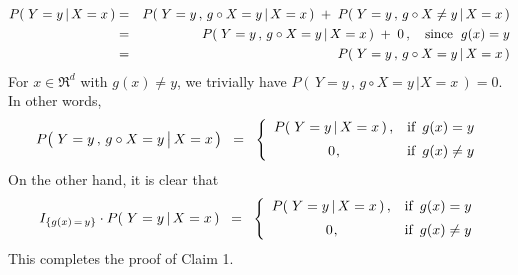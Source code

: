 \begin{eqnarray*}
P\!\left(\,\left. Y = y \,\right\vert X = x \,\right)
& = &
	P\!\left(\,\left. Y = y\,,\, g \circ X = y \,\right\vert X = x \,\right)
	\; + \;
	P\!\left(\,\left. Y = y\,,\, g \circ X \neq y \,\right\vert X = x \,\right)
\\
& = &
	P\!\left(\,\left. Y = y\,,\, g \circ X = y \,\right\vert X = x \,\right)
	\; + \;
	0\,,
	\quad
	\textnormal{since \;$g(x) = y$}
\\
& = &
	P\!\left(\,\left. Y = y\,,\, g \circ X = y \,\right\vert X = x \,\right)
\end{eqnarray*}
For $x \in \Re^{d}$ with $g(x) \neq y$, we trivially have
$P\!\left(\,\left. Y = y\,,\, g \circ X = y \,\right\vert X = x \,\right) = 0$.
In other words,
\begin{equation*}
P\!\left(\,\left. Y = y \,,\, \overset{{\color{white}.}}{g} \circ X = y \,\right\vert X = x \,\right)
\;\; = \;\;
	\left\{\begin{array}{cl}
	P\!\left(\,\left. Y = y \,\right\vert X = x \,\right), & \textnormal{if \,$g(x) = y$}
	\\
	\overset{{\color{white}-}}{0}, & \textnormal{if \,$g(x) \neq y$}
	\end{array}\right.
\end{equation*}
On the other hand, it is clear that
\begin{equation*}
I_{\{g(x)\,=\,y\}} \cdot P\!\left(\,\left. Y = y \,\right\vert X = x \,\right)
\;\; = \;\;
	\left\{\begin{array}{cl}
	P\!\left(\,\left. Y = y \,\right\vert X = x \,\right), & \textnormal{if \,$g(x) = y$}
	\\
	\overset{{\color{white}-}}{0}, & \textnormal{if \,$g(x) \neq y$}
	\end{array}\right.
\end{equation*}
This completes the proof of Claim 1.

